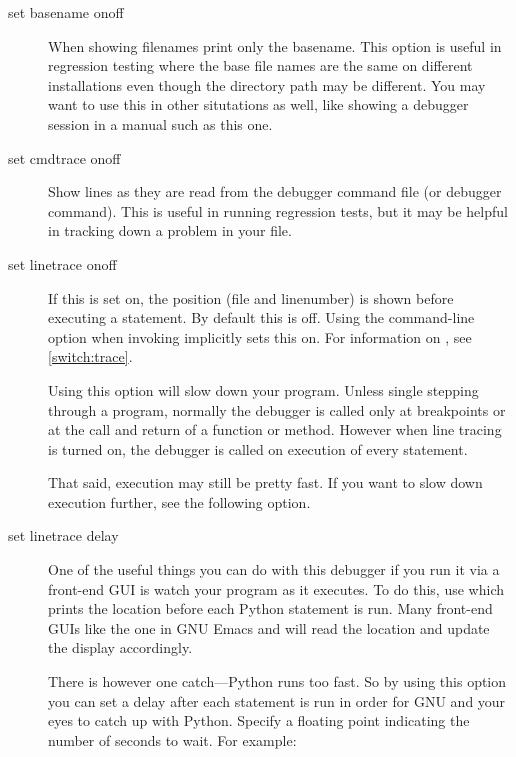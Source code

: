 \begin{description}

\item[set basename on\code{\Large{|}}off]\label{command:basename}

When showing filenames print only the basename. This option is useful
in regression testing where the base file names are the same
on different installations even though the directory path may
be different. You may want to use this in other
situtations as well, like showing a debugger session in a manual
such as this one. 

\item[set cmdtrace on\code{\Large{|}}off]\label{command:cmdtrace}
 
Show lines as they are read from the debugger command file (or
 debugger command). This is useful in running
regression tests, but it may be helpful in tracking down a problem in
your  file.

\item[set linetrace on\code{\Large{|}}off]\label{command:linetrace}

If this is set on, the position (file and linenumber) is shown before
executing a statement. By default this is off. Using the command-line
option  when invoking  implicitly sets this
on.  For information on , see \ref{switch:trace}.

Using this option will slow down your
program. Unless single stepping through a program, normally the
debugger is called only at breakpoints or at the call and return of a
function or method. However when line tracing is turned on, the
debugger is called on execution of every statement. 

That said, execution may still be pretty fast. If you want to slow
down execution further, see the following option.

\item[set linetrace delay ]\label{command:linetrace-delay}

One of the useful things you can do with this debugger if you run it
via a front-end GUI is watch your program as it executes. To do this,
use  which prints the location before each
Python statement is run. Many front-end GUIs like the one in GNU Emacs
and  will read the location and update the display
accordingly.

There is however one catch---Python runs too fast. So by using this
option you can set a delay after each statement is run in order for
GNU and your eyes to catch up with Python. Specify a floating
point indicating the number of seconds to wait. For example: 


\end{description}
